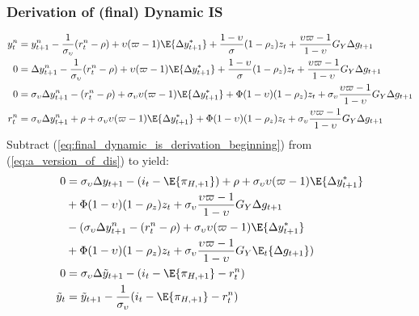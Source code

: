 \subsubsection*{Derivation of (final) Dynamic IS}
\begin{align}\label{eq:final_dynamic_is_derivation_beginning}
    y^n_t  &= y^n_{t+1} - \frac{1}{\sigma_\upsilon}(r^n_t - \rho) + \upsilon (\varpi - 1)\E \{\Delta y_{t+1}^* \}  + \frac{1-\upsilon}{\sigma} (1-\rho_z)z_t + \frac{\upsilon \varpi  - 1}{1-\upsilon} G_Y \Delta g_{t+1}\\
    0  &= \Delta y^n_{t+1} - \frac{1}{\sigma_\upsilon}(r^n_t - \rho) + \upsilon (\varpi - 1)\E \{\Delta y_{t+1}^* \}  + \frac{1-\upsilon}{\sigma} (1-\rho_z)z_t + \frac{\upsilon \varpi  - 1}{1-\upsilon} G_Y \Delta g_{t+1}\\
    0  &= \sigma_\upsilon \Delta y^n_{t+1} - (r^n_t - \rho) + \sigma_\upsilon \upsilon (\varpi - 1)\E \{\Delta y_{t+1}^* \}  + \Phi (1-\upsilon)(1-\rho_z)z_t + \sigma_\upsilon \frac{\upsilon \varpi  - 1}{1-\upsilon} G_Y \Delta g_{t+1}\\
    r^n_t  &= \sigma_\upsilon \Delta y^n_{t+1} + \rho + \sigma_\upsilon \upsilon (\varpi - 1)\E \{\Delta y_{t+1}^* \}  + \Phi (1-\upsilon)(1-\rho_z)z_t + \sigma_\upsilon \frac{\upsilon \varpi  - 1}{1-\upsilon} G_Y \Delta g_{t+1} \label{eq:appendix_natural_rate_of_interest_dynamic_is}
\end{align}
Subtract (\ref{eq:final_dynamic_is_derivation_beginning}) from (\ref{eq:a_version_of_dis}) to yield:
\begin{align}
    0 &= \sigma_\upsilon \Delta y_{t+1} - (i_t - \E \{ \pi_{H,+1}\}) + \rho + \sigma_\upsilon \upsilon (\varpi - 1)\E \{\Delta y_{t+1}^* \} \nonumber \\ 
    &+ \Phi(1-\upsilon) (1-\rho_z)z_t + \sigma_\upsilon \frac{\upsilon \varpi  - 1}{1-\upsilon} G_Y \Delta g_{t+1} \nonumber \\
    & - (\sigma_\upsilon \Delta y^n_{t+1} - (r^n_t - \rho) + \sigma_\upsilon \upsilon (\varpi - 1)\E \{\Delta y_{t+1}^* \}  \nonumber \\ 
    &+ \Phi (1-\upsilon)(1-\rho_z)z_t + \sigma_\upsilon \frac{\upsilon \varpi  - 1}{1-\upsilon} G_Y \E_t \{ \Delta g_{t+1} \})\\
    0 &= \sigma_\upsilon \Delta \tilde{y}_{t+1} - (i_t - \E \{ \pi_{H,+1}\} - r^n_t)\\
    \tilde{y}_t &= \tilde{y}_{t+1} - \frac{1}{\sigma_\upsilon}(i_t - \E \{ \pi_{H,+1}\} - r^n_t) \label{eq:final_dynamic_is_derivation_end}
\end{align}